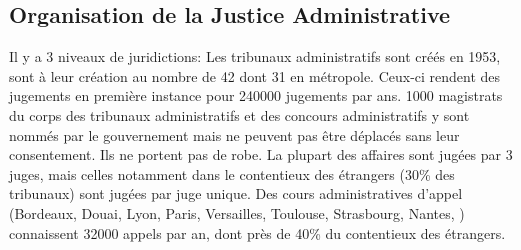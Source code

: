 \documentclass[math]{cours}
\begin{document}
\subsection{Organisation de la Justice Administrative}
Il y a 3 niveaux de juridictions:
Les tribunaux administratifs sont créés en 1953, sont à leur création au nombre de 42 dont 31 en métropole.
Ceux-ci rendent des jugements en première instance pour 240000 jugements par ans.
1000 magistrats du corps des tribunaux administratifs et des concours administratifs y sont nommés par le gouvernement mais ne peuvent pas être déplacés sans leur consentement.
Ils ne portent pas de robe.
La plupart des affaires sont jugées par 3 juges, mais celles notamment dans le contentieux des étrangers (30\% des tribunaux) sont jugées par juge unique.
Des cours administratives d'appel (Bordeaux, Douai, Lyon, Paris, Versailles, Toulouse, Strasbourg, Nantes, ) connaissent 32000 appels par an,
dont près de 40\% du contentieux des étrangers.
\end{document}
